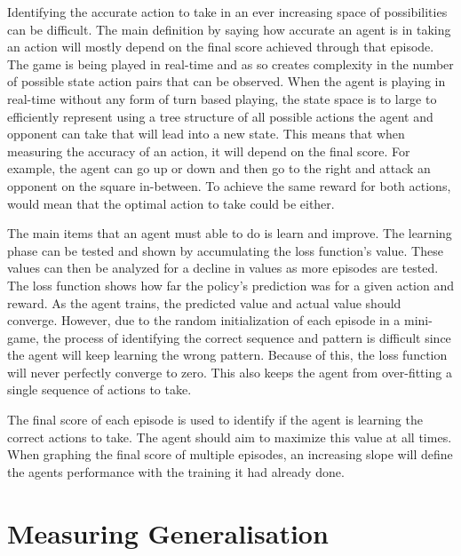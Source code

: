 Identifying the accurate action to take in an ever increasing space of possibilities can be difficult. The main definition by saying how accurate an agent is in taking an action will mostly depend on the final score achieved through that episode. The game is being played in real-time and as so creates complexity in the number of possible state action pairs that can be observed. When the agent is playing in real-time without any form of turn based playing, the state space is to large to efficiently represent using a tree structure of all possible actions the agent and opponent can take that will lead into a new state. This means that when measuring the accuracy of an action, it will depend on the final score. For example, the agent can go up or down and then go to the right and attack an opponent on the square in-between. To achieve the same reward for both actions, would mean that the optimal action to take could be either. 

The main items that an agent must able to do is learn and improve. The learning phase can be tested and shown by accumulating the loss function's value. These values can then be analyzed for a decline in values as more episodes are tested. The loss function shows how far the policy's prediction was for a given action and reward. As the agent trains, the predicted value and actual value should converge. However, due to the random initialization of each episode in a mini-game, the process of identifying the correct sequence and pattern is difficult since the agent will keep learning the wrong pattern. Because of this, the loss function will never perfectly converge to zero. This also keeps the agent from over-fitting a single sequence of actions to take.

The final score of each episode is used to identify if the agent is learning the correct actions to take. The agent should aim to maximize this value at all times. When graphing the final score of multiple episodes, an increasing slope will define the agents performance with the training it had already done.


\section{Measuring Generalisation}

